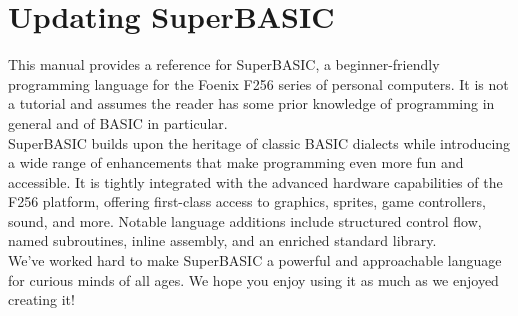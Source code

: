 \chapter{Updating SuperBASIC}

This manual provides a reference for SuperBASIC, a beginner-friendly programming language for the Foenix F256 series of personal computers. It is not a tutorial and assumes the reader has some prior knowledge of programming in general and of BASIC in particular.\\

SuperBASIC builds upon the heritage of classic BASIC dialects while introducing a wide range of enhancements that make programming even more fun and accessible. It is tightly integrated with the advanced hardware capabilities of the F256 platform, offering first-class access to graphics, sprites, game controllers, sound, and more. Notable language additions include structured control flow, named subroutines, inline assembly, and an enriched standard library. \\

We’ve worked hard to make SuperBASIC a powerful and approachable language for curious minds of all ages. We hope you enjoy using it as much as we enjoyed creating it!


